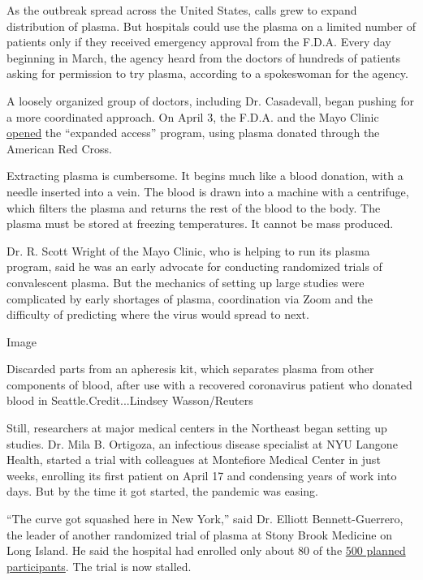 As the outbreak spread across the United States, calls grew to expand
distribution of plasma. But hospitals could use the plasma on a limited
number of patients only if they received emergency approval from the
F.D.A. Every day beginning in March, the agency heard from the doctors
of hundreds of patients asking for permission to try plasma, according
to a spokeswoman for the agency.

A loosely organized group of doctors, including Dr. Casadevall, began
pushing for a more coordinated approach. On April 3, the F.D.A. and the
Mayo Clinic
\href{https://www.fda.gov/news-events/press-announcements/coronavirus-covid-19-update-fda-coordinates-national-effort-develop-blood-related-therapies-covid-19}{opened}
the ``expanded access'' program, using plasma donated through the
American Red Cross.

Extracting plasma is cumbersome. It begins much like a blood donation,
with a needle inserted into a vein. The blood is drawn into a machine
with a centrifuge, which filters the plasma and returns the rest of the
blood to the body. The plasma must be stored at freezing temperatures.
It cannot be mass produced.

Dr. R. Scott Wright of the Mayo Clinic, who is helping to run its plasma
program, said he was an early advocate for conducting randomized trials
of convalescent plasma. But the mechanics of setting up large studies
were complicated by early shortages of plasma, coordination via Zoom and
the difficulty of predicting where the virus would spread to next.

Image

Discarded parts from an apheresis kit, which separates plasma from other
components of blood, after use with a recovered coronavirus patient who
donated blood in Seattle.Credit...Lindsey Wasson/Reuters

Still, researchers at major medical centers in the Northeast began
setting up studies. Dr. Mila B. Ortigoza, an infectious disease
specialist at NYU Langone Health, started a trial with colleagues at
Montefiore Medical Center in just weeks, enrolling its first patient on
April 17 and condensing years of work into days. But by the time it got
started, the pandemic was easing.

``The curve got squashed here in New York,'' said Dr. Elliott
Bennett-Guerrero, the leader of another randomized trial of plasma at
Stony Brook Medicine on Long Island. He said the hospital had enrolled
only about 80 of the
\href{https://clinicaltrials.gov/ct2/show/NCT04344535?term=convalescent+plasma\&type=Intr\&cond=COVID\&intr=randomized\&draw=3\&rank=20}{500
planned participants}. The trial is now stalled.

